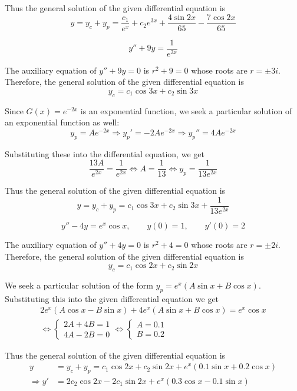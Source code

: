 \documentclass[a4paper,12pt]{article}
\begin{document}
Thus the general solution of the given differential equation is
\[y = y_c + y_p
= \frac{c_1}{e^x} + c_2 e^{3x} + \frac{4\sin 2x}{65} - \frac{7\cos 2x}{65}\]

\[y'' + 9y = \frac{1}{e^{2x}}\tag{3}\]

The auxiliary equation of $y'' + 9y = 0$ is $r^2 + 9 = 0$
whose roots are $r = \pm 3i$.
Therefore, the general solution of the given differential equation is
\[y_c = c_1\cos 3x + c_2\sin 3x\]

Since $G(x) = e^{-2x}$ is an exponential function, we seek
a particular solution of an exponential function as well:
\[y_p = Ae^{-2x}
\Longrightarrow y_p' = -2Ae^{-2x}
\Longrightarrow y_p'' = 4Ae^{-2x}\]

Substituting these into the differential equation, we get
\[\frac{13A}{e^{2x}} = \frac{1}{e^{2x}}
\iff A = \frac{1}{13}
\iff y_p = \frac{1}{13e^{2x}}\]

Thus the general solution of the given differential equation is
\[y = y_c + y_p = c_1\cos 3x + c_2\sin 3x + \frac{1}{13e^{2x}}\]

\[y'' - 4y = e^x\cos x,\qquad y(0) = 1,\qquad y'(0) = 2\tag{8}\]

The auxiliary equation of $y'' + 4y = 0$ is $r^2 + 4 = 0$
whose roots are $r = \pm 2i$.
Therefore, the general solution of the given differential equation is
\[y_c = c_1\cos 2x + c_2\sin 2x\]

We seek a particular solution of the form $y_p = e^x(A\sin x + B\cos x)$.
Substituting this into the given differential equation we get
\begin{multline*}
  2e^x(A\cos x - B\sin x) + 4e^x(A\sin x + B\cos x) = e^x\cos x\\
  \iff\begin{cases}
    2A + 4B = 1\\
    4A - 2B = 0
  \end{cases}
  \iff\begin{cases}
    A = 0.1\\
    B = 0.2
  \end{cases}
\end{multline*}

Thus the general solution of the given differential equation is
\begin{align*}
  y &= y_c + y_p = c_1\cos 2x + c_2\sin 2x + e^x(0.1\sin x + 0.2\cos x)\\
  \Longrightarrow y' &= 2c_2\cos 2x - 2c_1\sin 2x + e^x(0.3\cos x - 0.1\sin x)
\end{align*}
\end{document}
